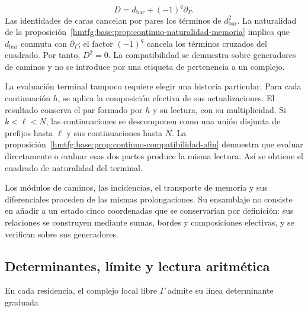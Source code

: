 \[
D=d_{\mathrm{bar}}+(-1)^q\partial_\Gamma.
\]
Las identidades de caras cancelan por pares los términos de \(d_{\mathrm{bar}}^2\). La naturalidad de la proposición~\ref{hmtfg:base:prop:continuo-naturalidad-memoria} implica que \(d_{\mathrm{bar}}\) conmuta con \(\partial_\Gamma\); el factor \((-1)^q\) cancela los términos cruzados del cuadrado. Por tanto, \(D^2=0\). La compatibilidad se demuestra sobre generadores de caminos y no se introduce por una etiqueta de pertenencia a un complejo.

La evaluación terminal tampoco requiere elegir una historia particular. Para cada continuación \(h\), se aplica la composición efectiva de sus actualizaciones. El resultado conserva el par formado por \(h\) y su lectura, con su multiplicidad. Si \(k<\ell<N\), las continuaciones se descomponen como una unión disjunta de prefijos hasta \(\ell\) y sus continuaciones hasta \(N\). La proposición~\ref{hmtfg:base:prop:continuo-compatibilidad-afin} demuestra que evaluar directamente o evaluar esas dos partes produce la misma lectura. Así se obtiene el cuadrado de naturalidad del terminal.

Los módulos de caminos, las incidencias, el transporte de memoria y sus diferenciales proceden de las mismas prolongaciones. Su ensamblaje no consiste en añadir a un estado cinco coordenadas que se conservarían por definición: sus relaciones se construyen mediante sumas, bordes y composiciones efectivas, y se verifican sobre sus generadores.

\subsection{Determinantes, límite y lectura aritmética}
En cada residencia, el complejo local libre \(\Gamma\) admite su línea determinante graduada


